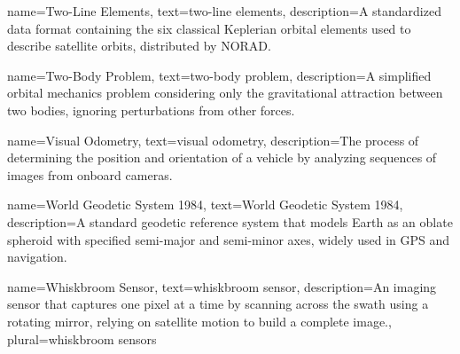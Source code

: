 {
	name=Two-Line Elements,
	text=two-line elements,
	description={A standardized data format containing the six classical Keplerian orbital elements used to describe satellite orbits, distributed by NORAD.}
}

{
	name=Two-Body Problem,
	text=two-body problem,
	description={A simplified orbital mechanics problem considering only the gravitational attraction between two bodies, ignoring perturbations from other forces.}
}

{
	name=Visual Odometry,
	text=visual odometry,
	description={The process of determining the position and orientation of a vehicle by analyzing sequences of images from onboard cameras.}
}

{
	name=World Geodetic System 1984,
	text=World Geodetic System 1984,
	description={A standard geodetic reference system that models Earth as an oblate spheroid with specified semi-major and semi-minor axes, widely used in GPS and navigation.}
}

{
	name=Whiskbroom Sensor,
	text=whiskbroom sensor,
	description={An imaging sensor that captures one pixel at a time by scanning across the swath using a rotating mirror, relying on satellite motion to build a complete image.},
	plural=whiskbroom sensors
}